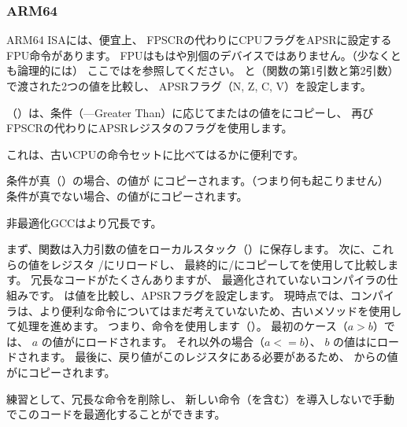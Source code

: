 ﻿\subsubsection{ARM64}




ARM64 \ac{ISA}には、便宜上、
\ac{FPSCR}の代わりにCPUフラグを\ac{APSR}に設定するFPU命令があります。
\ac{FPU}はもはや別個のデバイスではありません。（少なくとも論理的には）
ここではを参照してください。 と（関数の第1引数と第2引数）で渡された2つの値を比較し、
\ac{APSR}フラグ（N, Z, C, V）を設定します。

（）は、条件（---Greater Than）に応じてまたはの値をにコピーし、
再び\ac{FPSCR}の代わりに\ac{APSR}レジスタのフラグを使用します。

これは、古いCPUの命令セットに比べてはるかに便利です。

条件が真（）の場合、の値が
にコピーされます。（つまり何も起こりません）
条件が真でない場合、の値がにコピーされます。




非最適化GCCはより冗長です。

まず、関数は入力引数の値をローカルスタック（）に保存します。
次に、これらの値をレジスタ
/にリロードし、
最終的に/にコピーしてを使用して比較します。
冗長なコードがたくさんありますが、
最適化されていないコンパイラの仕組みです。 
は値を比較し、\ac{APSR}フラグを設定します。
現時点では、コンパイラは、より便利な命令についてはまだ考えていないため、古いメソッドを使用して処理を進めます。
つまり、命令を使用します（）。
最初のケース（$a>b$）では、 $a$ の値がにロードされます。
それ以外の場合（$a<=b$）、 $b$ の値はにロードされます。
最後に、戻り値がこのレジスタにある必要があるため、
からの値がにコピーされます。

\mysubparagraph{\Exercise}

練習として、冗長な命令を削除し、
新しい命令（を含む）を導入しないで手動でこのコードを最適化することができます。

